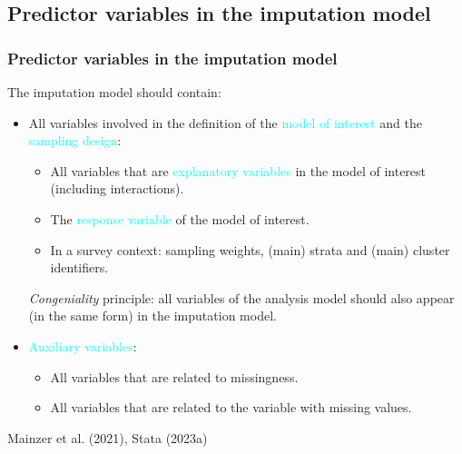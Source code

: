 \documentclass{beamer}
\begin{document}
\subsection{Predictor variables in the imputation model}

\begin{frame}
\frametitle{Predictor variables in the imputation model}

The imputation model should contain:
\begin{itemize}
\setlength\itemsep{0.3cm}
	\item All variables involved in the definition of the \textcolor{cyan}{model of interest} and the \textcolor{cyan}{sampling design}:
		\begin{itemize}
			\item All variables that are \textcolor{cyan}{explanatory variables} in the model of interest (including interactions).
			\item The \textcolor{cyan}{response variable} of the model of interest.	
			\item In a survey context: sampling weights, (main) strata and (main) cluster identifiers.
		\end{itemize}
		 \emph{Congeniality} principle: all variables of the analysis model should also appear (in the same form) in the imputation model.
	\item \textcolor{cyan}{Auxiliary variables}:
		\begin{itemize}
			\item All variables that are related to missingness.
			\item All variables that are related to the variable with missing values.
		\end{itemize}

\end{itemize}

\vfill
\footnotesize{Mainzer et al. (2021), Stata (2023a)}
\end{frame}
\end{document}
